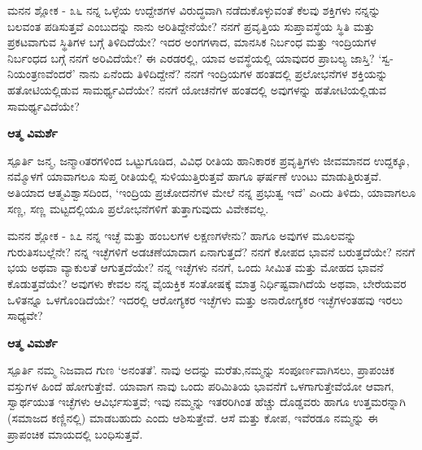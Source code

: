 \begin{mananam}{\mananamfont \large ಮನನ ಶ್ಲೋಕ - ೩೬}
\mananamtext ನನ್ನ ಒಳ್ಳೆಯ ಉದ್ದೇಶಗಳ ವಿರುದ್ಧವಾಗಿ ನಡೆದುಕೊಳ್ಳುವಂತೆ ಕೆಲವು ಶಕ್ತಿಗಳು ನನ್ನನ್ನು ಬಲವಂತ ಪಡಿಸುತ್ತವೆ ಎಂಬುದನ್ನು ನಾನು ಅರಿತಿದ್ದೇನೆಯೇ? ನನಗೆ ಪ್ರವೃತ್ತಿಯ ಸುಪ್ತಾವಸ್ಥೆಯ ಸ್ಥಿತಿ ಮತ್ತು ಪ್ರಕಟವಾಗುವ ಸ್ಥಿತಿಗಳ ಬಗ್ಗೆ ತಿಳಿದಿದೆಯೇ? ಇದರ ಅಂಗಗಳಾದ, ಮಾನಸಿಕ ನಿರ್ಬಂಧ ಮತ್ತು ಇಂದ್ರಿಯಗಳ ನಿರ್ಬಂಧದ ಬಗ್ಗೆ ನನಗೆ ಅರಿವಿದೆಯೇ? ಈ ಎರಡರಲ್ಲಿ, ಯಾವ ಅವಸ್ಥೆಯಲ್ಲಿ ಯಾವುದರ ಪ್ರಾಬಲ್ಯ ಜಾಸ್ತಿ? ‘ಸ್ವ-ನಿಯಂತ್ರಣವೆಂದರೆ’ ನಾನು ಏನೆಂದು ತಿಳಿದಿದ್ದೇನೆ? ನನಗೆ ಇಂದ್ರಿಯಗಳ ಹಂತದಲ್ಲಿ ಪ್ರಲೋಭನೆಗಳ ಶಕ್ತಿಯನ್ನು ಹತೋಟಿಯಲ್ಲಿಡುವ ಸಾಮರ್ಥ್ಯವಿದೆಯೇ? ನನಗೆ ಯೋಚನೆಗಳ ಹಂತದಲ್ಲಿ ಅವುಗಳನ್ನು ಹತೋಟಿಯಲ್ಲಿಡುವ ಸಾಮರ್ಥ್ಯವಿದೆಯೇ? 
\end{mananam}
\WritingHand\enspace\textbf{ಆತ್ಮ ವಿಮರ್ಶೆ}\\
\begin{inspiration}{\mananamfont \large ಸ್ಪೂರ್ತಿ}
\mananamtext ಜನ್ಮ, ಜನ್ಮಾoತರಗಳಿಂದ ಒಟ್ಟುಗೂಡಿದ, ವಿವಿಧ ರೀತಿಯ ಹಾನಿಕಾರಕ ಪ್ರವೃತ್ತಿಗಳು ಜೀವಮಾನದ ಉದ್ದಕ್ಕೂ, ನಮ್ಮೊಳಗೆ ಯಾವಾಗಲೂ ಸುಪ್ತ ರೀತಿಯಲ್ಲಿ ಸುಳಿಯುತ್ತಿರುತ್ತವೆ ಹಾಗೂ ಘರ್ಷಣೆ ಉಂಟು ಮಾಡುತ್ತಿರುತ್ತವೆ. ಅತಿಯಾದ ಆತ್ಮವಿಶ್ವಾಸದಿಂದ, ‘ಇಂದ್ರಿಯ ಪ್ರಚೋದನೆಗಳ ಮೇಲೆ ನನ್ನ ಪ್ರಭುತ್ವ ಇದೆ’ ಎoದು ತಿಳಿದು, ಯಾವಾಗಲೂ ಸಣ್ಣ, ಸಣ್ಣ ಮಟ್ಟದಲ್ಲಿಯೂ ಪ್ರಲೋಭನೆಗಳಿಗೆ ತುತ್ತಾಗುವುದು ವಿವೇಕವಲ್ಲ. 
\end{inspiration}
\newpage

\begin{mananam}{\mananamfont \large ಮನನ ಶ್ಲೋಕ - ೩೭}
\mananamtext ನನ್ನ ಇಚ್ಛೆ ಮತ್ತು ಹಂಬಲಗಳ ಲಕ್ಷಣಗಳೇನು? ಹಾಗೂ ಅವುಗಳ ಮೂಲವನ್ನು ಗುರುತಿಸಬಲ್ಲೆನೇ? ನನ್ನ ಇಚ್ಛೆಗಳಿಗೆ ಅಡಚಣೆಯಾದಾಗ ಏನಾಗುತ್ತದೆ? ನನಗೆ ಕೋಪದ ಭಾವನೆ ಬರುತ್ತದೆಯೇ? ನನಗೆ ಭಯ ಅಥವಾ ವ್ಯಾಕುಲತೆ ಆಗುತ್ತದೆಯೇ? ನನ್ನ ಇಚ್ಛೆಗಳು ನನಗೆ, ಒಂದು ಸೀಮಿತ ಮತ್ತು ಮೋಹದ ಭಾವನೆ ಕೊಡುತ್ತವೆಯೇ? ಅವುಗಳು ಕೇವಲ ನನ್ನ ವೈಯಕ್ತಿಕ ಸಂತೋಷಕ್ಕೆ ಮಾತ್ರ ನಿರ್ಧಿಷ್ಟವಾಗಿದೆಯೆ ಅಥವಾ, ಬೇರೆಯವರ ಒಳಿತನ್ನೂ ಒಳಗೊಂಡಿದೆಯೇ? ಇದರಲ್ಲಿ ಆರೋಗ್ಯಕರ ಇಚ್ಛೆಗಳು ಮತ್ತು ಅನಾರೋಗ್ಯಕರ ಇಚ್ಛೆಗಳಂತಹವು ಇರಲು ಸಾಧ್ಯವೇ? 
\end{mananam}
\WritingHand\enspace\textbf{ಆತ್ಮ ವಿಮರ್ಶೆ}\\
\begin{inspiration}{\mananamfont \large ಸ್ಪೂರ್ತಿ}
\mananamtext ನಮ್ಮ ನಿಜವಾದ ಗುಣ ‘ಅನಂತತೆ’. ನಾವು ಅದನ್ನು ಮರೆತು,ನಮ್ಮನ್ನು ಸಂಪೂರ್ಣವಾಗಿಸಲು, ಪ್ರಾಪಂಚಿಕ ವಸ್ತುಗಳ ಹಿಂದೆ ಹೋಗುತ್ತೇವೆ. ಯಾವಾಗ ನಾವು ಒಂದು ಪರಿಮಿತಿಯ ಭಾವನೆಗೆ ಒಳಗಾಗುತ್ತೇವೆಯೋ ಆವಾಗ, ಸ್ವಾರ್ಥಯುತ ಇಚ್ಛೆಗಳು ಆವಿರ್ಭಸುತ್ತವೆ; ಇವು ನಮ್ಮನ್ನು ಇತರರಿಗಿಂತ ಹೆಚ್ಚು ದೊಡ್ಡವರು ಹಾಗೂ ಉತ್ತಮರನ್ನಾಗಿ (ಸಮಾಜದ ಕಣ್ಣಿನಲ್ಲಿ) ಮಾಡಬಹುದು ಎಂದು ಆಶಿಸುತ್ತೇವೆ. ಆಸೆ ಮತ್ತು ಕೋಪ, ಇವೆರಡೂ ನಮ್ಮನ್ನು ಈ ಪ್ರಾಪಂಚಿಕ ಮಾಯದಲ್ಲಿ ಬಂಧಿಸುತ್ತವೆ.
\end{inspiration}
\newpage

